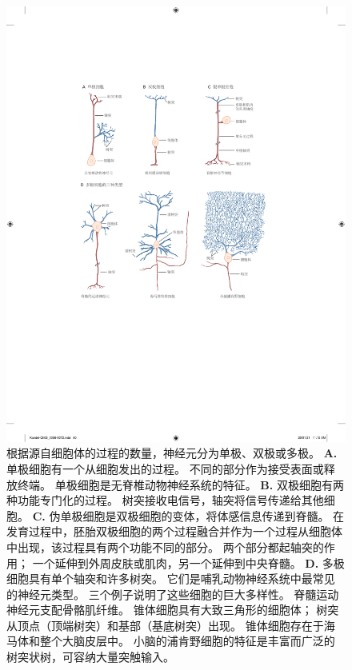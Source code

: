 \begin{figure}[htbp]
	\centering
	\includegraphics[width=0.95\linewidth]{chap03/fig_3_3}
	\caption{根据源自细胞体的过程的数量，神经元分为单极、双极或多极。 
		\textbf{A.} 单极细胞有一个从细胞发出的过程。
		不同的部分作为接受表面或释放终端。
		单极细胞是无脊椎动物神经系统的特征。 
		\textbf{B.} 双极细胞有两种功能专门化的过程。
		树突接收电信号，轴突将信号传递给其他细胞。
		\textbf{C.} 伪单极细胞是双极细胞的变体，将体感信息传递到脊髓。
		在发育过程中，胚胎双极细胞的两个过程融合并作为一个过程从细胞体中出现，该过程具有两个功能不同的部分。 
		两个部分都起轴突的作用；
		一个延伸到外周皮肤或肌肉，另一个延伸到中央脊髓\cite{ross2006histology}。
		\textbf{D.} 多极细胞具有单个轴突和许多树突。 
		它们是哺乳动物神经系统中最常见的神经元类型。 
		三个例子说明了这些细胞的巨大多样性。 
		脊髓运动神经元支配骨骼肌纤维。
		锥体细胞具有大致三角形的细胞体；
		树突从顶点（顶端树突）和基部（基底树突）出现。 
		锥体细胞存在于海马体和整个大脑皮层中。 
		小脑的浦肯野细胞的特征是丰富而广泛的树突状树，可容纳大量突触输入\cite{ross2006histology}。}
	\label{fig:3_3}
\end{figure}


